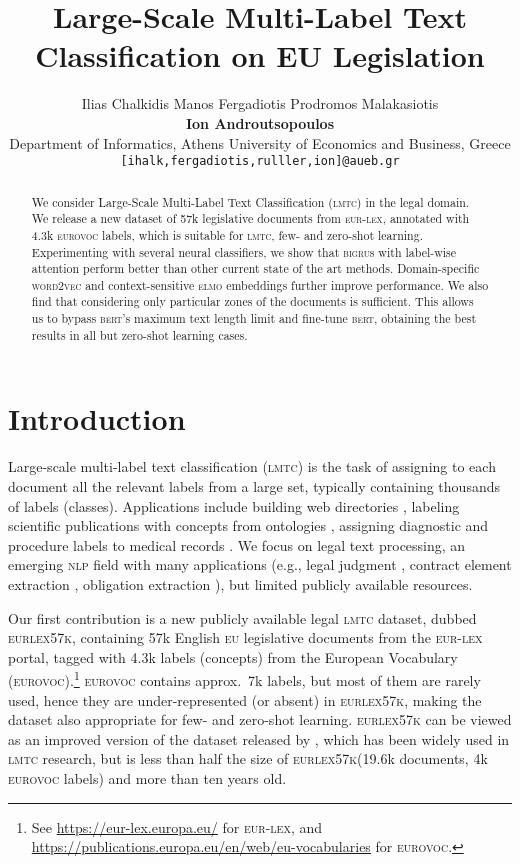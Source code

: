 \documentclass[11pt,a4paper]{article}
\title{Large-Scale Multi-Label Text Classification on EU Legislation}
\author{Ilias Chalkidis \qquad Manos Fergadiotis \qquad Prodromos Malakasiotis \\ \textbf{Ion Androutsopoulos} \\ Department of Informatics, Athens University of Economics and Business, Greece \\ 
{\tt {\normalsize[ihalk,fergadiotis,rulller,ion]@aueb.gr}}}
\date{}
\newcommand{\bigru}{\textsc{bigru}\xspace}
\newcommand{\wordvec}{\textsc{word2vec}\xspace}
\newcommand{\lmtc}{\textsc{lmtc}\xspace}
\newcommand{\elmo}{\textsc{elmo}\xspace}
\newcommand{\bert}{\textsc{bert}\xspace}
\newcommand{\newdata}{\textsc{eurlex57k}\xspace}
\newcommand{\eurovoc}{\textsc{eurovoc}\xspace}
\newcommand{\eu}{\textsc{eu}\xspace}
\newcommand{\eurlex}{\textsc{eur-lex}\xspace}
\begin{document}
\maketitle
\begin{abstract}
We consider Large-Scale Multi-Label Text Classification (\lmtc) in the legal domain. We release a new dataset of 57k legislative documents from \eurlex, annotated with 4.3k \eurovoc labels, which is suitable for \lmtc, few- and zero-shot learning. Experimenting with several neural classifiers, we show that \bigru{s} with label-wise attention perform better than other current state of the art methods. Domain-specific \wordvec and context-sensitive \elmo embeddings further improve performance. We also find that considering only particular zones of the documents is sufficient. This allows us to bypass \bert's maximum text length limit and fine-tune \bert, obtaining the best results in all but zero-shot learning cases. 
\end{abstract}

\section{Introduction}
Large-scale multi-label text classification (\lmtc) is the task of assigning to each document all the relevant labels from a large set, typically containing thousands of labels (classes). Applications include building web directories \citep{Partalas2015LSHTCAB}, labeling scientific publications with concepts from ontologies \cite{Tsatsaronis2015}, assigning diagnostic and procedure labels to medical records \cite{Mullenbach2018,Rios2018-2}. We focus on legal text processing, an emerging \textsc{nlp} field with many applications (e.g., legal judgment \cite{Nallapati2008,Aletras2016}, contract element extraction \cite{Chalkidis2017}, obligation extraction \cite{Chalkidis2018b}), but limited publicly available resources.

Our first contribution is a new publicly available legal \lmtc dataset, dubbed \newdata, containing 57k English \eu legislative documents from the \eurlex portal, tagged with 4.3k labels (concepts) from the European Vocabulary (\eurovoc).\footnote{See \url{https://eur-lex.europa.eu/} for \eurlex, and \url{https://publications.europa.eu/en/web/eu-vocabularies} for \eurovoc.} \eurovoc contains approx.\ 7k labels, but most of them are rarely used, hence they are under-represented (or  absent) in \newdata, making the dataset also appropriate for few- and zero-shot learning. \newdata can be viewed as an improved version of the dataset released by \citet{Mencia2007}, which has been widely used in \lmtc research, but is less than half the size of \newdata (19.6k documents, 4k \eurovoc labels) and more than ten years old. 
\end{document}

